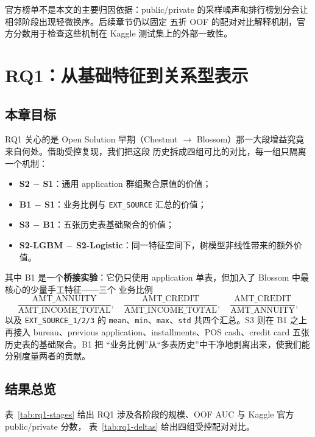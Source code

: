 \documentclass[11pt,UTF8,fontset=windows]{ctexrep}
\begin{document}
官方榜单不是本文的主要归因依据：public/private 的采样噪声和排行榜划分会让相邻阶段出现轻微换序。后续章节仍以固定
五折 OOF 的配对对比解释机制，官方分数用于检查这些机制在 Kaggle 测试集上的外部一致性。

\chapter{RQ1：从基础特征到关系型表示}
\label{chap:rq1}

\section{本章目标}

RQ1 关心的是 Open Solution 早期（Chestnut $\to$ Blossom）那一大段增益究竟来自何处。借助受控复现，我们把这段
历史拆成四组可比的对比，每一组只隔离一个机制：

\begin{itemize}
\item \textbf{S2 $-$ S1}：通用 application 群组聚合原值的价值；
\item \textbf{B1 $-$ S1}：业务比例与 \texttt{EXT\_SOURCE} 汇总的价值；
\item \textbf{S3 $-$ B1}：五张历史表基础聚合的价值；
\item \textbf{S2-LGBM $-$ S2-Logistic}：同一特征空间下，树模型非线性带来的额外价值。
\end{itemize}

其中 B1 是一个\textbf{桥接实验}：它仍只使用 application 单表，但加入了 Blossom 中最核心的少量手工特征——三个
业务比例
\[
\frac{\text{AMT\_ANNUITY}}{\text{AMT\_INCOME\_TOTAL}},\quad
\frac{\text{AMT\_CREDIT}}{\text{AMT\_INCOME\_TOTAL}},\quad
\frac{\text{AMT\_CREDIT}}{\text{AMT\_ANNUITY}},
\]
以及 \texttt{EXT\_SOURCE\_1/2/3} 的 \texttt{mean}、\texttt{min}、\texttt{max}、\texttt{std} 共四个汇总。S3 则在
B1 之上再接入 bureau、previous application、installments、POS cash、credit card 五张历史表的基础聚合。B1 把
“业务比例”从“多表历史”中干净地剥离出来，使我们能分别度量两者的贡献。

\section{结果总览}

表~\ref{tab:rq1-stages} 给出 RQ1 涉及各阶段的规模、OOF AUC 与 Kaggle 官方 public/private 分数，
表~\ref{tab:rq1-deltas} 给出四组受控配对对比。
\end{document}
